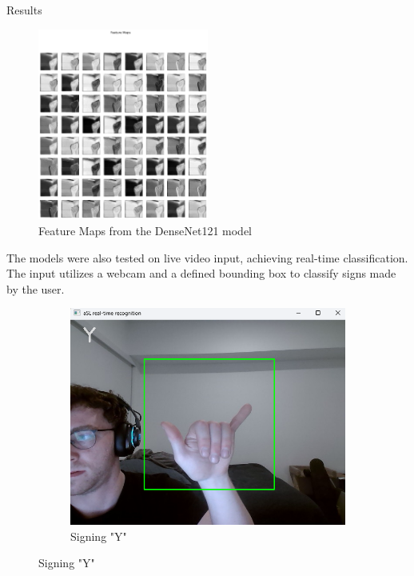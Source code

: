 \documentclass[12pt, a4paper]{article}
\begin{document}
\begin{section}{Results}
\begin{figure}[H]
    \end{figure}
    \begin{figure}[H]
        \centering
        \includegraphics[width=0.5\textwidth]{../plots/DenseNet121_Visualize.png}
        \caption{Feature Maps from the DenseNet121 model}
        \label{fig:densenet121_visualize}
    \end{figure}
    The models were also tested on live video input, achieving real-time classification. The input utilizes a webcam and a defined bounding box to classify signs made by the user.
    \begin{figure}[H]
        \centering
        \begin{subfigure}[b]{0.45\textwidth}
            \centering
            \includegraphics[width=\textwidth]{../plots/real_time_sample.png}
            \caption{Signing "Y"}
            \label{fig:signY}
        \end{subfigure}

\end{figure}
\end{section}
\end{document}

